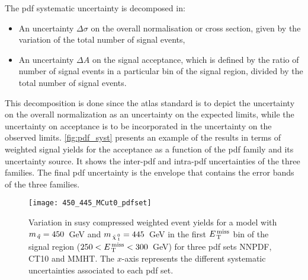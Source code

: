 The \gls{pdf} systematic uncertainty is decomposed in:
\begin{itemize}
\item An uncertainty $\Delta \sigma$ on the overall normalisation or cross
  section, given by the variation of the total number of signal events,
\item An uncertainty $\Delta A$ on the signal acceptance, which is defined by
  the ratio of number of signal events in a particular bin of the signal region,
  divided by the total number of signal events.
\end{itemize}
This decomposition is done since the \gls{atlas} standard is to depict the
uncertainty on the overall normalization as an uncertainty on the expected
limits, while the uncertainty on acceptance is to be incorporated in the
uncertainty on the observed limits. \cref{fig:pdf_syst} presents an example of
the results in terms of weighted signal yields for the acceptance as a function
of the \gls{pdf} family and its uncertainty source. It shows the inter-\gls{pdf}
and intra-\gls{pdf} uncertainties of the three families. The final \gls{pdf}
uncertainty is the envelope that contains the error bands of the three families.
\begin{figure}[!h]
\centering
\texttt{[image: 450\_445\_MCut0\_pdfset]}
\caption{Variation in \gls{susy} compressed weighted event yields for a model
  with $m_{\, \tilde{q}} = 450$~GeV and $m_{\, \tilde{\chi}_{\, 1}^{\, 0}} = 445$~GeV in the first $E_\mathrm{\, T}^\mathrm{\, miss}$ bin
  of the signal region ($250 < E_\mathrm{\, T}^\mathrm{\, miss} < 300$~GeV) for three \gls{pdf} sets NNPDF,
  CT10 and MMHT. The $x$-axis represents the different systematic uncertainties
  associated to each \gls{pdf} set.}
\label{fig:susy_pdfsysts}
\end{figure}


